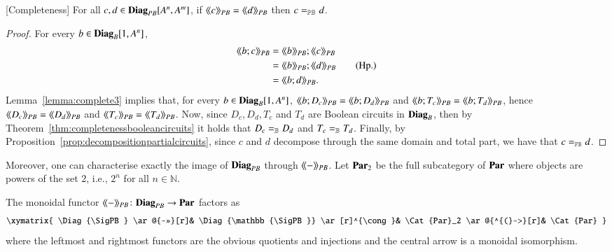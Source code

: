 \begin{theorem}\label{thm:completenesspartialcircuits}[Completeness]
  For all $c,d\in \mathbf{Diag}_{PB}[A^n,A^m]$, if $\langle\!\langle{c}\rangle\! \rangle_{PB}=\langle\!\langle{d}\rangle\! \rangle_{PB}$ then $c=_{\mathbb{PB }}d$.
\end{theorem}
\begin{proof}
  For every $b\in \mathbf{Diag}_{B}[1,A^n]$, 
  \begin{align}
    \osemPB{b;c}&=\osemPB{b};\osemPB{c} \notag\\
    &=\osemPB{b};\osemPB{d} \tag{Hp.}\\
    &=\osemPB{b;d}. \notag
  \end{align}
  Lemma~\ref{lemma:complete3} implies that, for every $b\in \mathbf{Diag}_{B}[1,A^n]$, $\langle\!\langle{b;D_c}\rangle\! \rangle_{PB}=\langle\!\langle{b;D_d}\rangle\! \rangle_{PB}$ and $\langle\!\langle{b;T_c}\rangle\! \rangle_{PB}=\langle\!\langle{b;T_d}\rangle\! \rangle_{PB}$, hence $\langle\!\langle{D_c}\rangle\! \rangle_{PB} = \langle\!\langle{D_d}\rangle\! \rangle_{PB}$ and $\langle\!\langle{T_c}\rangle\! \rangle_{PB} = \langle\!\langle{T_d}\rangle\! \rangle_{PB}$. Now, since $D_c,D_d,T_c$ and $T_d$ are Boolean circuits in $\mathbf{Diag}_{B}$, then by Theorem~\ref{thm:completenessbooleancircuits} it holds that $D_c=_{\mathbb{B}} D_d$ and $T_c=_{\mathbb{B}} T_d$. Finally, by Proposition~\ref{prop:decompositionpartialcircuits}, since $c$ and $d$ decompose through the same domain and total part, we have that $c\eqPB d$.
\end{proof}
Moreover, one can characterise exactly the image of $\mathbf{Diag}_{PB}$ through $\langle\!\langle{-}\rangle\! \rangle_{PB}$. Let $\mathbf{Par}_2$ be the full subcategory of $\mathbf{Par}$ where objects are powers of the set $2$, i.e.,  $2^n$ for all $n \in \mathbb{N}$.


\begin{proposition}\label{prop:isopartialboolean}
The monoidal functor  $\langle\!\langle{-}\rangle\! \rangle_{PB}\colon \mathbf{Diag}_{{PB }} \to \mathbf{Par}$ factors as
\[\xymatrix{ \Diag{\SigPB } \ar@{->>}[r]& \Diag{\mathbb{\SigPB }} \ar[r]^{\cong}& \Cat{Par}_2 \ar@{^{(}->}[r]& \Cat{Par} }\]
where the leftmost and rightmost functors are the obvious quotients and injections and the central arrow is a monoidal isomorphism.
\end{proposition}



